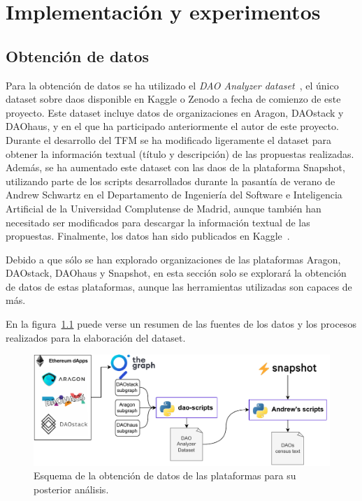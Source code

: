 \chapter{Implementación y experimentos}
\label{ch:implementacion_experimentos}

\section{Obtención de datos}
\label{sec:obtencion-datos}

Para la obtención de datos se ha utilizado el \textit{DAO Analyzer dataset}~\cite{arroyo_dao_2024}, el único dataset sobre \glspl{dao} disponible en Kaggle o Zenodo a fecha de comienzo de este proyecto. Este dataset incluye datos de organizaciones en Aragon, DAOstack y DAOhaus, y en el que ha participado anteriormente el autor de este proyecto. Durante el desarrollo del TFM se ha modificado ligeramente el dataset para obtener la información textual (título y descripción) de las propuestas realizadas. Además, se ha aumentado este dataset con las \glspl{dao} de la plataforma Snapshot, utilizando parte de los scripts desarrollados durante la pasantía de verano de Andrew Schwartz en el Departamento de Ingeniería del Software e Inteligencia Artificial de la Universidad Complutense de Madrid, aunque también han necesitado ser modificados para descargar la información textual de las propuestas. Finalmente, los datos han sido publicados en Kaggle~\cite{tfm-dataset-text}.

Debido a que sólo se han explorado organizaciones de las plataformas Aragon, DAOstack, DAOhaus y Snapshot, en esta sección solo se explorará la obtención de datos de estas plataformas, aunque las herramientas utilizadas son capaces de más.

En la figura~\ref{fig:daos-census} puede verse un resumen de las fuentes de los datos y los procesos realizados para la elaboración del dataset.

\begin{figure}[tbh]
    \centering
    \includegraphics[width=\linewidth]{figures/04_implementacion/daos-census-Horizontal.drawio.pdf}
    \caption{Esquema de la obtención de datos de las plataformas para su posterior análisis.}
    \label{fig:daos-census}
\end{figure}

